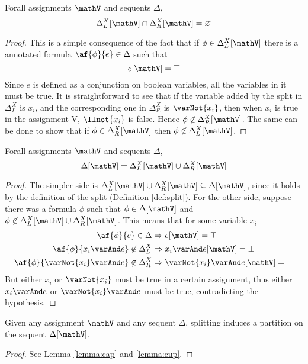 \begin{lemma}
	\label{lemma:cap}
	Forall assignments $\mathV$ and sequents $\Delta$,
	$$ \Delta_L^X[\mathV] \cap \Delta_R^X[\mathV] = \varnothing $$
\end{lemma}
\begin{proof}
	This is a simple consequence of the fact that if $\phi \in \Delta_L^X[\mathV]$ there is a annotated formula $\af{\phi}{e} \in \Delta$ such that 
	$$ e[\mathV] = \top $$
	Since $e$ is defined as a conjunction on boolean variables, all the variables in it must be true.
	It is straightforward to see that if the variable added by the split in $\Delta_L^X$ is $x_i$, and the corresponding one in $\Delta_R^X$ is $\varNot{x_i}$, then when $x_i$ is true in the assignment V, $\llnot{x_i}$ is false.
	Hence $\phi \not \in \Delta_R^X[\mathV]$.
	The same can be done to show that if $\phi \in \Delta_R^X[\mathV]$ then $\phi \not \in \Delta_L^X[\mathV]$.
\end{proof}
\begin{lemma}
	\label{lemma:cup}
	Forall assignments $\mathV$ and sequents $\Delta$,
	$$ \Delta[\mathV] = \Delta_L^X[\mathV] \cup \Delta_R^X[\mathV] $$
\end{lemma}
\begin{proof}
	The simpler side is $\Delta_L^X[\mathV] \cup \Delta_R^X[\mathV] \subseteq \Delta[\mathV]$, since it  holds by the definition of the split (Definition \ref{def:split}).
	For the other side, suppose there was a formula $\phi$ such that $\phi \in \Delta[\mathV]$ and $\phi \not \in \Delta_L^X[\mathV] \cup \Delta_R^X[\mathV]$.
	This means that for some variable $x_i$ 
	\begin{align*}
		\af{\phi}{e} \in \Delta &\Rightarrow e[\mathV] = \top \\
		\af{\phi}{x_i \varAnd e} \not \in \Delta_L^X &\Rightarrow x_i \varAnd e[\mathV] = \bot \\
		\af{\phi}{\varNot{x_i} \varAnd e} \not \in \Delta_R^X &\Rightarrow \varNot{x_i} \varAnd e[\mathV] = \bot
	\end{align*}
	But either $x_i$ or $\varNot{x_i}$ must be true in a certain assignment, thus either $x_i \varAnd e$ or $\varNot{x_i} \varAnd e$ must be true, contradicting the hypothesis.
\end{proof}
\begin{lemma}
	Given any assignment $\mathV$ and any sequent $\Delta$, splitting induces a partition on the sequent $\Delta[\mathV]$.
\end{lemma}
\begin{proof}
	See Lemma \ref{lemma:cap} and \ref{lemma:cup}.
\end{proof}

